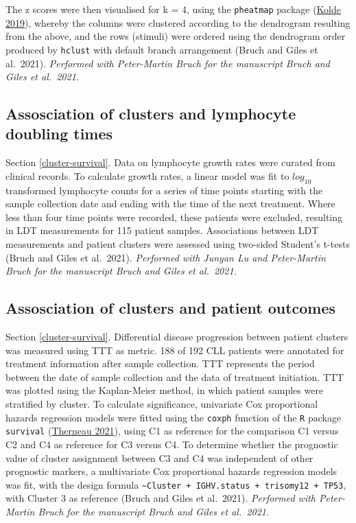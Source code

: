 \documentclass[11pt, a4paper, twosided]{book}
\begin{document}
The z scores were then visualised for k = 4, using the \texttt{pheatmap} package (\protect\hyperlink{ref-R-pheatmap}{Kolde 2019}), whereby the columns were clustered according to the dendrogram resulting from the above, and the rows (stimuli) were ordered using the dendrogram order produced by \texttt{hclust} with default branch arrangement (Bruch and Giles et al.~2021). \emph{Performed with Peter-Martin Bruch for the manuscript Bruch and Giles et al.~2021.}

\hypertarget{LDT-method}{%
\subsection{Assosciation of clusters and lymphocyte doubling times}\label{LDT-method}}

Section \ref{cluster-survival}. Data on lymphocyte growth rates were curated from clinical records. To calculate growth rates, a linear model was fit to \(log_{10}\) transformed lymphocyte counts for a series of time points starting with the sample collection date and ending with the time of the next treatment. Where less than four time points were recorded, these patients were excluded, resulting in LDT measurements for 115 patient samples. Associations between LDT measurements and patient clusters were assessed using two-sided Student's t-tests (Bruch and Giles et al.~2021). \emph{Performed with Junyan Lu and Peter-Martin Bruch for the manuscript Bruch and Giles et al.~2021.}

\hypertarget{survival-method}{%
\subsection{Assosciation of clusters and patient outcomes}\label{survival-method}}

Section \ref{cluster-survival}. Differential disease progression between patient clusters was measured using TTT as metric. 188 of 192 CLL patients were annotated for treatment information after sample collection. TTT represents the period between the date of sample collection and the data of treatment initiation. TTT was plotted using the Kaplan-Meier method, in which patient samples were stratified by cluster. To calculate significance, univariate Cox proportional hazards regression models were fitted using the \texttt{coxph} function of the \texttt{R} package \texttt{survival} (\protect\hyperlink{ref-R-survival}{Therneau 2021}), using C1 as reference for the comparison C1 versus C2 and C4 as reference for C3 versus C4. To determine whether the prognostic value of cluster assignment between C3 and C4 was independent of other prognostic markers, a multivariate Cox proportional hazards regression models was fit, with the design formula \texttt{\textasciitilde{}Cluster\ +\ IGHV.status\ +\ trisomy12\ +\ TP53}, with Cluster 3 as reference (Bruch and Giles et al.~2021). \emph{Performed with Peter-Martin Bruch for the manuscript Bruch and Giles et al.~2021.}
\end{document}
